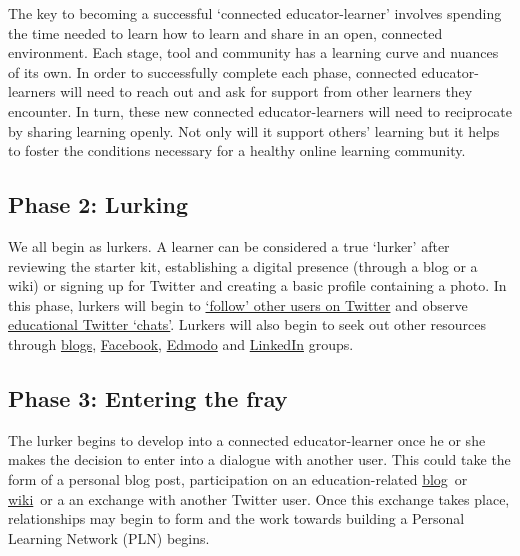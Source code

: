 The key to becoming a successful `connected educator-learner' involves
spending the time needed to learn how to learn and share in an open,
connected environment. Each stage, tool and community has a learning
curve and nuances of its own. In order to successfully complete each
phase, connected educator-learners will need to reach out and ask for
support from other learners they encounter. In turn, these new connected
educator-learners will need to reciprocate by sharing learning openly.
Not only will it support others' learning but it helps to foster the
conditions necessary for a healthy online learning community.

\subsection{Phase 2: Lurking}

We all begin as lurkers. A learner can be considered a true `lurker'
after reviewing the starter kit, establishing a digital presence
(through a blog or a wiki) or signing up for Twitter and creating a
basic profile containing a photo. In this phase, lurkers will begin to
\href{http://www.google.com/url?q=http\%3A\%2F\%2Fwww.fractuslearning.com\%2F2012\%2F05\%2F25\%2Ftwitter-follow-education-technology\%2F\&sa=D\&sntz=1\&usg=AFQjCNF8grPMuRwU\_ImW9Jk3ZYrg0m9KgQ}{`follow'
other users on Twitter} and observe
\href{http://www.google.com/url?q=http\%3A\%2F\%2Fcybraryman.com\%2Fchats.html\&sa=D\&sntz=1\&usg=AFQjCNFJASZiwfvPbfOzFbHvAunpXfNC1g}{educational
Twitter `chats'}. Lurkers will also begin to seek out other resources
through
\href{http://theinnovativeeducator.blogspot.ca/2012/04/ten-best-education-blogs.html}{blogs},
\href{http://www.google.com/url?q=http\%3A\%2F\%2Fwww.edsocialmedia.com\%2F2011\%2F02\%2Fthe-advantage-of-facebook-groups-in-education\%2F\&sa=D\&sntz=1\&usg=AFQjCNEvc43Q7GqJqS-2S8GhEJ53Ye-j4Q}{Facebook},
\href{http://www.slideshare.net/cmsdsquires/edmodo-for-teachers-guide}{Edmodo}
and
\href{http://www.emergingedtech.com/2012/02/8-great-linkedin-groups-for-educators/}{LinkedIn}
groups.

\subsection{Phase 3: Entering the fray}

The lurker begins to develop into a connected educator-learner once he
or she makes the decision to enter into a dialogue with another user.
This could take the form of a personal blog post, participation on an
education-related
\href{http://edudemic.com/2012/08/education-blogs/?utm\_medium=twitter\&utm\_source=twitterfeed}{blog}~or
\href{http://educationalwikis.wikispaces.com/Examples+of+educational+wikis}{wiki}~or
a an exchange with another Twitter user. Once this exchange takes place,
relationships may begin to form and the work towards building a Personal
Learning Network (PLN) begins.

